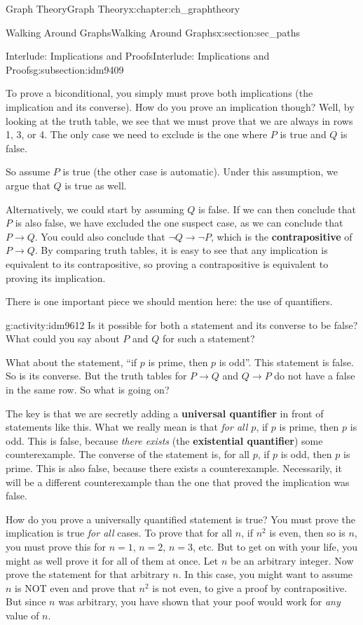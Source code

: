 \documentclass[oneside,10pt,]{book}
\newcommand{\terminology}[1]{\textbf{#1}}
\numberwithin{equation}{chapter}
\def\imp{\rightarrow}
\begin{document}
\begin{chapterptx}{Graph Theory}{}{Graph Theory}{}{}{x:chapter:ch_graphtheory}
\begin{sectionptx}{Walking Around Graphs}{}{Walking Around Graphs}{}{}{x:section:sec_paths}
\begin{subsectionptx}{Interlude: Implications and Proofs}{}{Interlude: Implications and Proofs}{}{}{g:subsection:idm9409}
\par
To prove a biconditional, you simply must prove both implications (the implication and its converse).  How do you prove an implication though?  Well, by looking at the truth table, we see that we must prove that we are always in rows 1, 3, or 4.  The only case we need to exclude is the one where \(P\) is true and \(Q\) is false.%
\par
So assume \(P\) is true (the other case is automatic).  Under this assumption, we argue that \(Q\) is true as well.%
\par
Alternatively, we could start by assuming \(Q\) is false.  If we can then conclude that \(P\) is also false, we have excluded the one suspect case, as we can conclude that \(P \imp Q\).  You could also conclude that \(\neg Q \imp \neg P\), which is the \terminology{contrapositive} of \(P \imp Q\).  By comparing truth tables, it is easy to see that any implication is equivalent to its contrapositive, so proving a contrapositive is equivalent to proving its implication.%
\par
There is one important piece we should mention here: the use of quantifiers.%
\begin{activity}{}{g:activity:idm9612}%
Is it possible for both a statement and its converse to be false?  What could you say about \(P\) and \(Q\) for such a statement?%
\end{activity}
What about the statement, ``if \(p\) is prime, then \(p\) is odd''.  This statement is false.  So is its converse.  But the truth tables for \(P \imp Q\) and \(Q \imp P\) do not have a false in the same row.  So what is going on?%
\par
The key is that we are secretly adding a \terminology{universal quantifier} in front of statements like this.  What we really mean is that \emph{for all \(p\)}, if \(p\) is prime, then \(p\) is odd.  This is false, because \emph{there exists} (the \terminology{existential quantifier}) some counterexample.  The converse of the statement is, for all \(p\), if \(p\) is odd, then \(p\) is prime.  This is also false, because there exists a counterexample.  Necessarily, it will be a different counterexample than the one that proved the implication was false.%
\par
How do you prove a universally quantified statement is true?  You must prove the implication is true \emph{for all} cases.  To prove that for all \(n\), if \(n^2\) is even, then so is \(n\), you must prove this for \(n = 1\), \(n = 2\), \(n =3\), etc.  But to get on with your life, you might as well prove it for all of them at once.  Let \(n\) be an arbitrary integer.  Now prove the statement for that arbitrary \(n\).  In this case, you might want to assume \(n\) is NOT even and prove that \(n^2\) is not even, to give a proof by contrapositive.  But since \(n\) was arbitrary, you have shown that your poof would work for \emph{any} value of \(n\).%

\end{subsectionptx}
\end{sectionptx}
\end{chapterptx}
\end{document}
